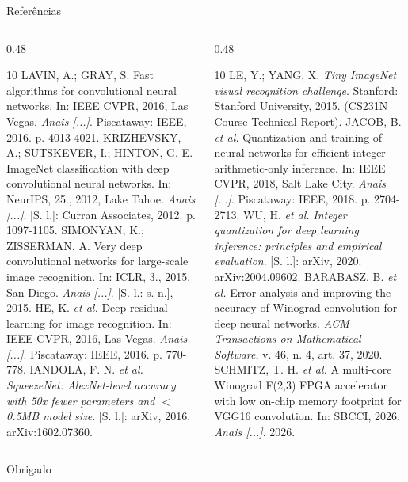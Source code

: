 \documentclass[t,aspectratio=169,12pt,xcolor=table]{beamer}
\begin{document}
\begin{frame}{Referências}
  \tiny
  \begin{columns}[T]
    \begin{column}{0.48\textwidth}
      \begin{thebibliography}{10}
         LAVIN, A.; GRAY, S. Fast algorithms for convolutional neural networks. In: IEEE CVPR, 2016, Las Vegas. \textit{Anais [...]}. Piscataway: IEEE, 2016. p. 4013-4021.
         KRIZHEVSKY, A.; SUTSKEVER, I.; HINTON, G. E. ImageNet classification with deep convolutional neural networks. In: NeurIPS, 25., 2012, Lake Tahoe. \textit{Anais [...]}. [S. l.]: Curran Associates, 2012. p. 1097-1105.
         SIMONYAN, K.; ZISSERMAN, A. Very deep convolutional networks for large-scale image recognition. In: ICLR, 3., 2015, San Diego. \textit{Anais [...]}. [S. l.: s. n.], 2015.
         HE, K. \textit{et al.} Deep residual learning for image recognition. In: IEEE CVPR, 2016, Las Vegas. \textit{Anais [...]}. Piscataway: IEEE, 2016. p. 770-778.
         IANDOLA, F. N. \textit{et al.} \textit{SqueezeNet: AlexNet-level accuracy with 50x fewer parameters and $<$0.5MB model size}. [S. l.]: arXiv, 2016. arXiv:1602.07360.
      \end{thebibliography}
    \end{column}
    \begin{column}{0.48\textwidth}
      \begin{thebibliography}{10}
        \setcounter{enumiv}{5}
         LE, Y.; YANG, X. \textit{Tiny ImageNet visual recognition challenge}. Stanford: Stanford University, 2015. (CS231N Course Technical Report).
         JACOB, B. \textit{et al.} Quantization and training of neural networks for efficient integer-arithmetic-only inference. In: IEEE CVPR, 2018, Salt Lake City. \textit{Anais [...]}. Piscataway: IEEE, 2018. p. 2704-2713.
         WU, H. \textit{et al.} \textit{Integer quantization for deep learning inference: principles and empirical evaluation}. [S. l.]: arXiv, 2020. arXiv:2004.09602.
         BARABASZ, B. \textit{et al.} Error analysis and improving the accuracy of Winograd convolution for deep neural networks. \textit{ACM Transactions on Mathematical Software}, v. 46, n. 4, art. 37, 2020.
         SCHMITZ, T. H. \textit{et al.} A multi-core Winograd F(2,3) FPGA accelerator with low on-chip memory footprint for VGG16 convolution. In: SBCCI, 2026. \textit{Anais [...]}. 2026.
      \end{thebibliography}
    \end{column}
  \end{columns}
\end{frame}

\begin{frame}[plain]
  \centering\vfill
  {Obrigado}
  \vfill
\end{frame}
\end{document}
